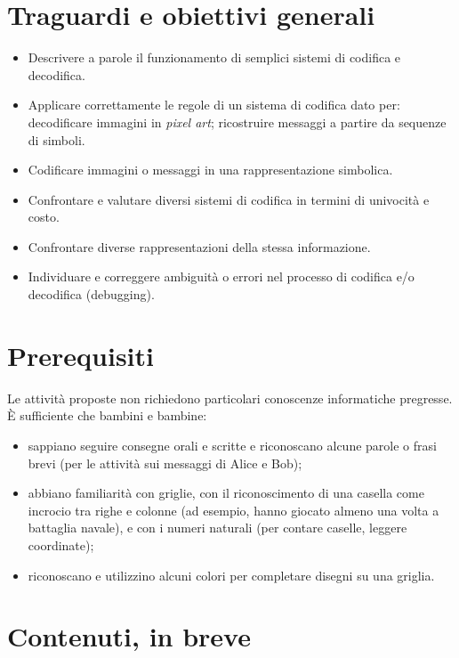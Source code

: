 \section{Traguardi e obiettivi generali }\label{traguardi-e-obiettivi-generali-2}

\begin{itemize}
\item
  Descrivere a parole il funzionamento di semplici sistemi di codifica e decodifica.
\item
  Applicare correttamente le regole di un sistema di codifica dato per: decodificare immagini in \emph{pixel art}; ricostruire messaggi a partire da sequenze di simboli.
\item
  Codificare immagini o messaggi in una rappresentazione simbolica.
\item
  Confrontare e valutare diversi sistemi di codifica in termini di univocità e costo.
\item
  Confrontare diverse rappresentazioni della stessa informazione.
\item
  Individuare e correggere ambiguità o errori nel processo di codifica e/o decodifica (debugging).
\end{itemize}

\section{Prerequisiti }\label{prerequisiti-2}

Le attività proposte non richiedono particolari conoscenze informatiche pregresse. È sufficiente che bambini e bambine:

\begin{itemize}
\item
  sappiano seguire consegne orali e scritte e riconoscano alcune parole o frasi brevi (per le attività sui messaggi di Alice e Bob);
\item
  abbiano familiarità con griglie, con il riconoscimento di una casella come incrocio tra righe e colonne (ad esempio, hanno giocato almeno una volta a battaglia navale), e con i numeri naturali (per contare caselle, leggere coordinate);
\item
  riconoscano e utilizzino alcuni colori per completare disegni su una griglia.
\end{itemize}

\section{Contenuti, in breve }\label{contenuti-in-breve-2}

